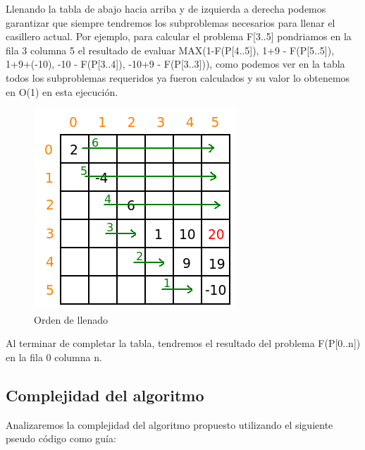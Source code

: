 Llenando la tabla de abajo hacia arriba y de izquierda a derecha podemos garantizar que siempre tendremos los subproblemas necesarios para llenar el casillero actual. Por ejemplo, para calcular el problema F[3..5] pondriamos en la fila 3 columna 5 el resultado de evaluar MAX(1-F(P[4..5]), 1+9 - F(P[5..5]), 1+9+(-10), -10 - F(P[3..4]), -10+9 - F(P[3..3])), como podemos ver en la tabla todos los subproblemas requeridos ya fueron calculados y su valor lo obtenemos en O(1) en esta ejecuci\'on.

\begin{figure}[h]
\begin{center}
\includegraphics[scale=0.6]{./img/ej1_res4.png}
\caption{Orden de llenado}
\end{center}
\end{figure}

Al terminar de completar la tabla, tendremos el resultado del problema F(P[0..n]) en la fila 0 columna n.

\newpage 

\subsection{Complejidad del algoritmo}

Analizaremos la complejidad del algoritmo propuesto utilizando el siguiente pseudo c\'odigo como gu\'ia: \\


